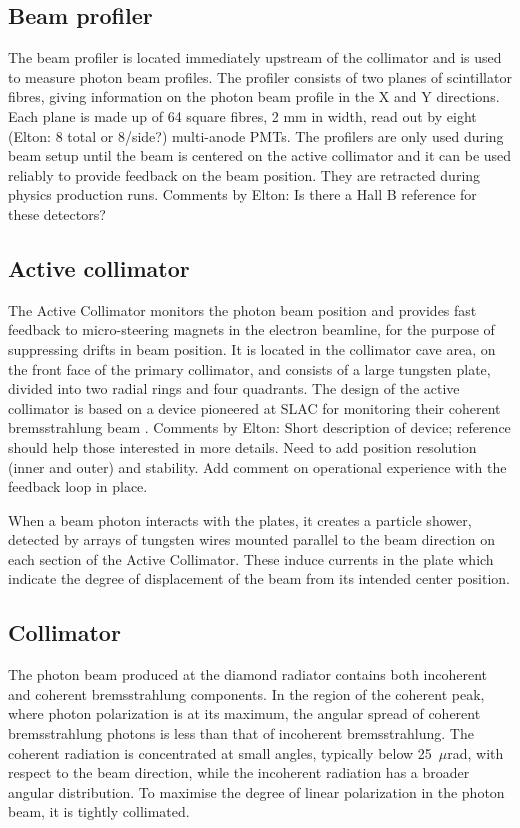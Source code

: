 \subsection{Beam profiler}
The beam profiler is located immediately upstream of the collimator and is used to measure photon beam profiles.
The profiler consists of two planes of scintillator fibres, giving information on the photon beam profile in the X and Y directions.
Each plane is made up of 64 square fibres, 2 mm in width, read out by eight {\color{red} (Elton: 8 total or 8/side?)} multi-anode PMTs. The profilers are only used during beam setup until
the beam is centered on the active collimator and it can be used reliably to provide feedback on the beam position. They are retracted during physics production runs.
{\color{red} Comments by Elton: Is there a Hall B reference for these detectors?}

\subsection{Active collimator \label{sec:coll}}
The Active Collimator monitors the photon beam position and provides fast feedback to micro-steering magnets in the electron beamline, for the purpose of suppressing drifts in beam position.
It is located in the collimator cave area, on the front face of the primary collimator, and consists of a large tungsten plate, divided into two radial rings and four quadrants. The design of the active collimator is based on a device pioneered at SLAC for monitoring their coherent bremsstrahlung beam \cite{Miller:1973yi}. 
{\color{red} Comments by Elton: Short description of device; reference should help those interested in more details. Need to add position resolution (inner and outer) and stability. Add comment on operational experience with the feedback loop in place.}

When a beam photon interacts with the plates, it creates a particle shower, detected by arrays of tungsten wires mounted parallel to the beam direction on each section of the Active Collimator.
These induce currents in the plate which indicate the degree of displacement of the beam from its intended center position.

\subsection{Collimator}
The photon beam produced at the diamond radiator contains both incoherent and coherent bremsstrahlung components.
In the region of the coherent peak, where photon polarization is at its maximum, the angular spread of coherent bremsstrahlung photons is less than that of incoherent bremsstrahlung.
The coherent radiation is concentrated at small angles, typically below 25~$\mu$rad, with respect to the beam direction, while the incoherent radiation has a broader angular distribution.
To maximise the degree of linear polarization in the photon beam, it is tightly collimated.


